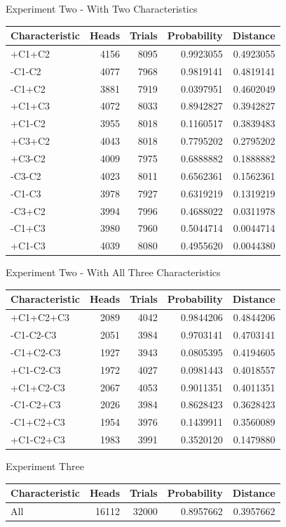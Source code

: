 \documentclass[
  ignorenonframetext,
]{beamer}
\renewcommand{\,}{\text{, }}
\begin{document}
\begin{frame}{Experiment Two - With Two Characteristics}
\protect\hypertarget{experiment-two---with-two-characteristics}{}

\begin{longtable}[]{@{}lrrrr@{}}
\toprule
Characteristic & Heads & Trials & Probability & Distance\tabularnewline
\midrule
\endhead
+C1+C2 & 4156 & 8095 & 0.9923055 & 0.4923055\tabularnewline
-C1-C2 & 4077 & 7968 & 0.9819141 & 0.4819141\tabularnewline
-C1+C2 & 3881 & 7919 & 0.0397951 & 0.4602049\tabularnewline
+C1+C3 & 4072 & 8033 & 0.8942827 & 0.3942827\tabularnewline
+C1-C2 & 3955 & 8018 & 0.1160517 & 0.3839483\tabularnewline
+C3+C2 & 4043 & 8018 & 0.7795202 & 0.2795202\tabularnewline
+C3-C2 & 4009 & 7975 & 0.6888882 & 0.1888882\tabularnewline
-C3-C2 & 4023 & 8011 & 0.6562361 & 0.1562361\tabularnewline
-C1-C3 & 3978 & 7927 & 0.6319219 & 0.1319219\tabularnewline
-C3+C2 & 3994 & 7996 & 0.4688022 & 0.0311978\tabularnewline
-C1+C3 & 3980 & 7960 & 0.5044714 & 0.0044714\tabularnewline
+C1-C3 & 4039 & 8080 & 0.4955620 & 0.0044380\tabularnewline
\bottomrule
\end{longtable}

\end{frame}

\begin{frame}{Experiment Two - With All Three Characteristics}
\protect\hypertarget{experiment-two---with-all-three-characteristics}{}

\begin{longtable}[]{@{}lrrrr@{}}
\toprule
Characteristic & Heads & Trials & Probability & Distance\tabularnewline
\midrule
\endhead
+C1+C2+C3 & 2089 & 4042 & 0.9844206 & 0.4844206\tabularnewline
-C1-C2-C3 & 2051 & 3984 & 0.9703141 & 0.4703141\tabularnewline
-C1+C2-C3 & 1927 & 3943 & 0.0805395 & 0.4194605\tabularnewline
+C1-C2-C3 & 1972 & 4027 & 0.0981443 & 0.4018557\tabularnewline
+C1+C2-C3 & 2067 & 4053 & 0.9011351 & 0.4011351\tabularnewline
-C1-C2+C3 & 2026 & 3984 & 0.8628423 & 0.3628423\tabularnewline
-C1+C2+C3 & 1954 & 3976 & 0.1439911 & 0.3560089\tabularnewline
+C1-C2+C3 & 1983 & 3991 & 0.3520120 & 0.1479880\tabularnewline
\bottomrule
\end{longtable}

\end{frame}

\begin{frame}{Experiment Three}
\protect\hypertarget{experiment-three}{}

\begin{longtable}[]{@{}lrrrr@{}}
\toprule
Characteristic & Heads & Trials & Probability & Distance\tabularnewline
\midrule
\endhead
All & 16112 & 32000 & 0.8957662 & 0.3957662\tabularnewline
\bottomrule
\end{longtable}

\end{frame}
\end{document}
